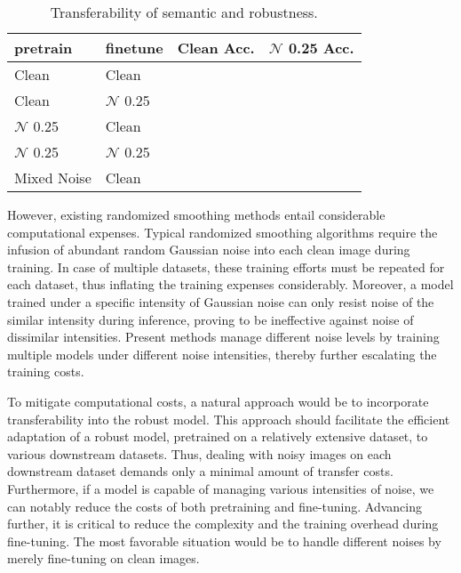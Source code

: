 \begin{table}[t]
  \label{tab:sum}
  \centering
  \caption{Transferability of semantic and robustness.}
  \begin{tabular}{llll}
  \hline
  pretrain    & finetune   & Clean Acc. & $\mathcal{N}$ 0.25 Acc. \\ \hline
  Clean       & Clean      &            &                 \\
  Clean       & $\mathcal{N}$ 0.25 &            &                 \\
  $\mathcal{N}$ 0.25  & Clean      &            &                 \\
  $\mathcal{N}$ 0.25  & $\mathcal{N}$ 0.25 &            &                 \\
  Mixed Noise & Clean      &            &                 \\ \hline
  \end{tabular}
\end{table}


However, existing randomized smoothing methods entail considerable computational expenses.
Typical randomized smoothing algorithms require the infusion of abundant random Gaussian noise into each clean image during training.
In case of multiple datasets, these training efforts must be repeated for each dataset, thus inflating the training expenses considerably.
Moreover,  a model trained under a specific intensity of Gaussian noise can only resist noise of the similar intensity during inference, proving to be ineffective against noise of dissimilar intensities.
Present methods manage different noise levels by training multiple models under different noise intensities, thereby further escalating the training costs.


To mitigate computational costs, a natural approach would be to incorporate transferability into the robust model. 
This approach should facilitate the efficient adaptation of a robust model, pretrained on a relatively extensive dataset, to various downstream datasets.
Thus,  dealing with noisy images on each downstream dataset demands only a minimal amount of transfer costs.
Furthermore, if a model is capable of managing various intensities of noise, we can notably reduce the costs of both pretraining and fine-tuning.
Advancing further, it is critical to reduce the complexity and the training overhead during fine-tuning.
The most favorable situation would be to handle different noises by merely fine-tuning on clean images.


